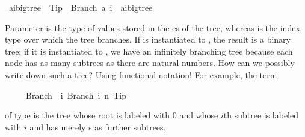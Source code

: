 %
\begin{isabellebody}%
\def\isabellecontext{Fundata}%
\ {\isacharparenleft}{\isacharprime}a{\isacharcomma}{\isacharprime}i{\isacharparenright}bigtree\ {\isacharequal}\ Tip\ {\isacharbar}\ Branch\ {\isacharprime}a\ {\isachardoublequote}{\isacharprime}i\ {\isasymRightarrow}\ {\isacharparenleft}{\isacharprime}a{\isacharcomma}{\isacharprime}i{\isacharparenright}bigtree{\isachardoublequote}%
\begin{isamarkuptext}%
\noindent
Parameter  is the type of values stored in
the es of the tree, whereas  is the index
type over which the tree branches. If  is instantiated to
, the result is a binary tree; if it is instantiated to
, we have an infinitely branching tree because each node
has as many subtrees as there are natural numbers. How can we possibly
write down such a tree? Using functional notation! For example, the term
\begin{isabelle}%
\ \ \ \ \ Branch\ {}\ {\isacharparenleft}{\isasymlambda}i{\isachardot}\ Branch\ i\ {\isacharparenleft}{\isasymlambda}n{\isachardot}\ Tip{\isacharparenright}{\isacharparenright}%
\end{isabelle}
of type  is the tree whose
root is labeled with 0 and whose $i$th subtree is labeled with $i$ and
has merely s as further subtrees.


\end{isamarkuptext}
\end{isabellebody}
